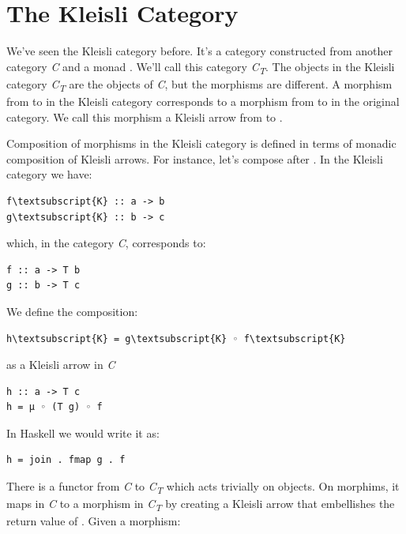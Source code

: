 \section{The Kleisli Category}\label{the-kleisli-category}

We've seen the Kleisli category before. It's a category constructed from
another category \emph{C} and a monad . We'll call this
category \emph{C\textsubscript{T}}. The objects in the Kleisli category
\emph{C\textsubscript{T}} are the objects of \emph{C}, but the morphisms
are different. A morphism  from  to  in
the Kleisli category corresponds to a morphism  from
 to  in the original category. We call this
morphism a Kleisli arrow from  to .

Composition of morphisms in the Kleisli category is defined in terms of
monadic composition of Kleisli arrows. For instance, let's compose
 after . In the Kleisli category we have:

\begin{Verbatim}[commandchars=\\\{\}]
f\textsubscript{K} :: a -> b
g\textsubscript{K} :: b -> c
\end{Verbatim}
which, in the category \emph{C}, corresponds to:

\begin{Verbatim}[commandchars=\\\{\}]
f :: a -> T b
g :: b -> T c
\end{Verbatim}
We define the composition:

\begin{Verbatim}[commandchars=\\\{\}]
h\textsubscript{K} = g\textsubscript{K} ◦ f\textsubscript{K}
\end{Verbatim}
as a Kleisli arrow in \emph{C}

\begin{Verbatim}[commandchars=\\\{\}]
h :: a -> T c
h = μ ◦ (T g) ◦ f
\end{Verbatim}
In Haskell we would write it as:

\begin{Verbatim}[commandchars=\\\{\}]
h = join . fmap g . f
\end{Verbatim}
There is a functor  from \emph{C} to \emph{C\textsubscript{T}}
which acts trivially on objects. On morphims, it maps  in
\emph{C} to a morphism in \emph{C\textsubscript{T}} by creating a
Kleisli arrow that embellishes the return value of . Given a
morphism:


